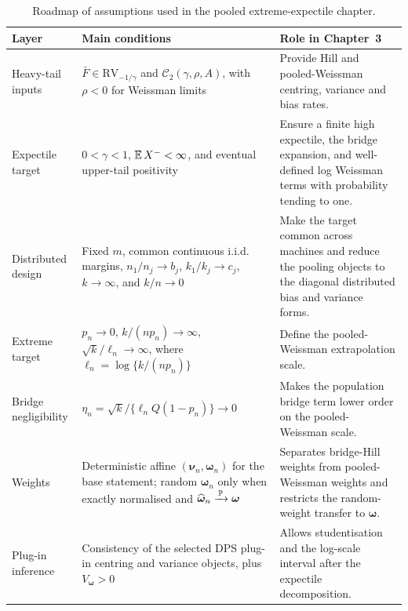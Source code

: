 \begin{table}[htbp]
\centering
\small
\caption{Roadmap of assumptions used in the pooled extreme-expectile chapter.}
\label{tab:bg:assumption-roadmap}
\setlength{\tabcolsep}{4pt}
\begin{tabular}{@{}>{\raggedright\arraybackslash}p{}
                  >{\raggedright\arraybackslash}p{}
                  >{\raggedright\arraybackslash}p{}@{}}
\toprule
Layer & Main conditions & Role in Chapter~3 \\
\midrule
Heavy-tail inputs &
\(\bar F\in\mathrm{RV}_{-1/\gamma}\) and
\(\mathcal C_2(\gamma,\rho,A)\), with \(\rho<0\) for Weissman limits &
Provide Hill and pooled-Weissman centring, variance and bias rates. \\
Expectile target &
\(0<\gamma<1\), \(\operatorname{\mathbb{E}} X^-<\infty\), and eventual upper-tail positivity &
Ensure a finite high expectile, the bridge expansion, and well-defined log
Weissman terms with probability tending to one. \\
Distributed design &
Fixed \(m\), common continuous i.i.d. margins, \(n_1/n_j\to b_j\),
\(k_1/k_j\to c_j\), \(k\to\infty\), and \(k/n\to0\) &
Make the target common across machines and reduce the pooling objects to the
diagonal distributed bias and variance forms. \\
Extreme target &
\(p_n\to0\), \(k/(np_n)\to\infty\),
\(\sqrt{k}/\ell_n\to\infty\), where
\(\ell_n=\log\{k/(np_n)\}\) &
Define the pooled-Weissman extrapolation scale. \\
Bridge negligibility &
\(\eta_n=\sqrt{k}/\{\ell_n Q(1-p_n)\}\to0\) &
Makes the population bridge term lower order on the pooled-Weissman scale. \\
Weights &
Deterministic affine \((\bm\nu_n,\bm\omega_n)\) for the base statement;
random \(\widehat{\bm\omega}_n\) only when exactly normalised and
\(\widehat{\bm\omega}_n\xrightarrow{\,\operatorname{\mathbb{P}}\,}\bm\omega\) &
Separates bridge-Hill weights from pooled-Weissman weights and restricts the
random-weight transfer to \(\bm\omega\). \\
Plug-in inference &
Consistency of the selected DPS plug-in centring and variance objects, plus
\(V_{\bm\omega}>0\) &
Allows studentisation and the log-scale interval after the expectile
decomposition. \\
\bottomrule
\end{tabular}
\end{table}
